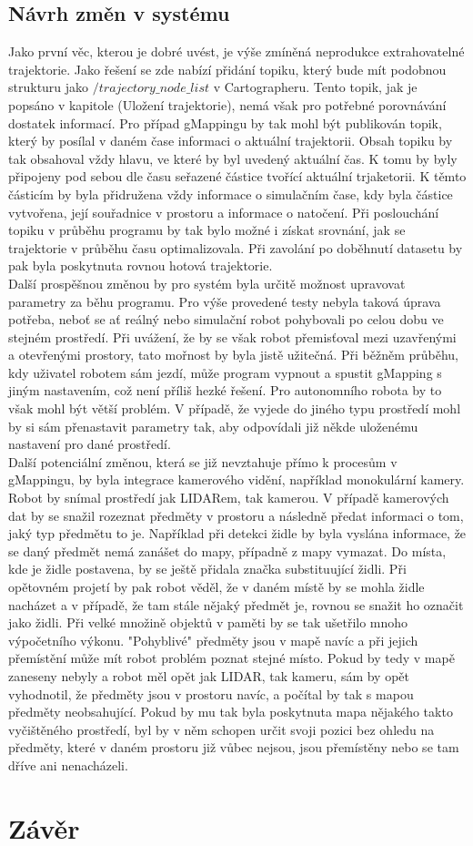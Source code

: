\documentclass[12pt]{article}
\begin{document}
\newpage
\subsection{Návrh změn v systému}
Jako první věc, kterou je dobré uvést, je výše zmíněná neprodukce extrahovatelné trajektorie. Jako řešení se zde nabízí přidání topiku, který bude mít podobnou strukturu jako $/trajectory\_node\_list$ v Cartographeru. Tento topik, jak je popsáno v kapitole (Uložení trajektorie), nemá však pro potřebné porovnávání dostatek informací. Pro případ gMappingu by tak mohl být publikován topik, který by posílal v daném čase informaci o aktuální trajektorii. Obsah topiku by tak obsahoval vždy hlavu, ve které by byl uvedený aktuální čas. K tomu by byly připojeny pod sebou dle času seřazené částice tvořící aktuální trjaketorii. K těmto částicím by byla přidružena vždy informace o simulačním čase, kdy byla částice vytvořena, její souřadnice v prostoru a informace o natočení. Při poslouchání topiku v průběhu programu by tak bylo možné i získat srovnání, jak se trajektorie v průběhu času optimalizovala. Při zavolání po doběhnutí datasetu by pak byla poskytnuta rovnou hotová trajektorie.\\
\indent Další prospěšnou změnou by pro systém byla určitě možnost upravovat parametry za běhu programu. Pro výše provedené testy nebyla taková úprava potřeba, neboť se ať reálný nebo simulační robot pohybovali po celou dobu ve stejném prostředí. Při uvážení, že by se však robot přemisťoval mezi uzavřenými a otevřenými prostory, tato mořnost by byla jistě užitečná. Při běžněm průběhu, kdy uživatel robotem sám jezdí, může program vypnout a spustit gMapping s jiným nastavením, což není příliš hezké řešení. Pro autonomního robota by to však mohl být větší problém. V případě, že vyjede do jiného typu prostředí mohl by si sám přenastavit parametry tak, aby odpovídali již někde uloženému nastavení pro dané prostředí.\\
\indent Další potenciální změnou, která se již nevztahuje přímo k procesům v gMappingu, by byla integrace kamerového vidění, například monokulární kamery. Robot by snímal prostředí jak LIDARem, tak kamerou. V případě kamerových dat by se snažil rozeznat předměty v prostoru a následně předat informaci o tom, jaký typ předmětu to je. Například při detekci židle by byla vyslána informace, že se daný předmět nemá zanášet do mapy, případně z mapy vymazat. Do místa, kde je židle postavena, by se ještě přidala značka substituující židli. Při opětovném projetí by pak robot věděl, že v daném místě by se mohla židle nacházet a v případě, že tam stále nějaký předmět je, rovnou se snažit ho označit jako židli. Při velké množině objektů v paměti by se tak ušetřilo mnoho výpočetního výkonu. "Pohyblivé" předměty jsou v mapě navíc a při jejich přemístění může mít robot problém poznat stejné místo. Pokud by tedy v mapě zaneseny nebyly a robot měl opět jak LIDAR, tak kameru, sám by opět vyhodnotil, že předměty jsou v prostoru navíc, a počítal by tak s mapou předměty neobsahující. Pokud by mu tak byla poskytnuta mapa nějakého takto vyčištěného prostředí, byl by v něm schopen určit svoji pozici bez ohledu na předměty, které v daném prostoru již vůbec nejsou, jsou přemístěny nebo se tam dříve ani nenacházeli.

\newpage
\section{Závěr}
\end{document}
